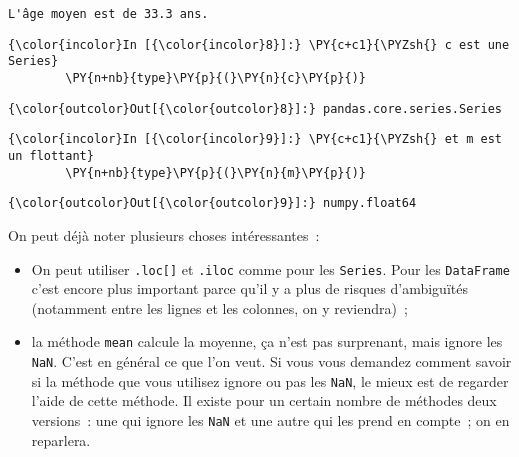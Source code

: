     \begin{Verbatim}[commandchars=\\\{\},frame=single,framerule=0.3mm,rulecolor=\color{cellframecolor}]
L'âge moyen est de 33.3 ans.
\end{Verbatim}

    \begin{Verbatim}[commandchars=\\\{\},frame=single,framerule=0.3mm,rulecolor=\color{cellframecolor}]
{\color{incolor}In [{\color{incolor}8}]:} \PY{c+c1}{\PYZsh{} c est une Series}
        \PY{n+nb}{type}\PY{p}{(}\PY{n}{c}\PY{p}{)}
\end{Verbatim}


\begin{Verbatim}[commandchars=\\\{\},frame=single,framerule=0.3mm,rulecolor=\color{cellframecolor}]
{\color{outcolor}Out[{\color{outcolor}8}]:} pandas.core.series.Series
\end{Verbatim}
            
    \begin{Verbatim}[commandchars=\\\{\},frame=single,framerule=0.3mm,rulecolor=\color{cellframecolor}]
{\color{incolor}In [{\color{incolor}9}]:} \PY{c+c1}{\PYZsh{} et m est un flottant}
        \PY{n+nb}{type}\PY{p}{(}\PY{n}{m}\PY{p}{)}
\end{Verbatim}


\begin{Verbatim}[commandchars=\\\{\},frame=single,framerule=0.3mm,rulecolor=\color{cellframecolor}]
{\color{outcolor}Out[{\color{outcolor}9}]:} numpy.float64
\end{Verbatim}
            
    On peut déjà noter plusieurs choses intéressantes~:

\begin{itemize}
\item
  On peut utiliser \texttt{.loc{[}{]}} et \texttt{.iloc} comme pour les
  \texttt{Series}. Pour les \texttt{DataFrame} c'est encore plus
  important parce qu'il y a plus de risques d'ambiguïtés (notamment
  entre les lignes et les colonnes, on y reviendra)~;
\item
  la méthode \texttt{mean} calcule la moyenne, ça n'est pas surprenant,
  mais ignore les \texttt{NaN}. C'est en général ce que l'on veut. Si
  vous vous demandez comment savoir si la méthode que vous utilisez
  ignore ou pas les \texttt{NaN}, le mieux est de regarder l'aide de
  cette méthode. Il existe pour un certain nombre de méthodes deux
  versions~: une qui ignore les \texttt{NaN} et une autre qui les prend
  en compte~; on en reparlera.
\end{itemize}

